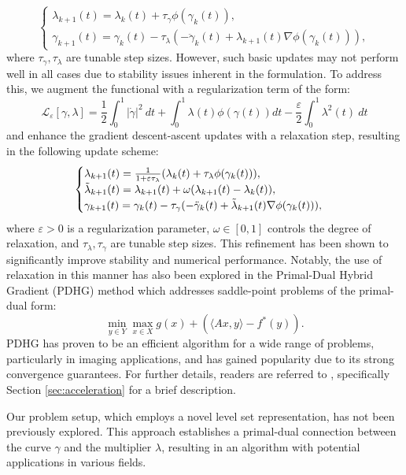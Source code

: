 \documentclass[12pt]{amsart}
\theoremstyle{definition}
\theoremstyle{remark}
\numberwithin{equation}{section}
\numberwithin{equation}{section}
\begin{document}
\[
\begin{cases}
 \lambda_{k+1}(t)  = \lambda_k(t)+\tau_\gamma \phi(\gamma_{k}(t)), \\
    \gamma_{k+1}(t)  = \gamma_k(t)-\tau_\lambda \left(-\ddot{\gamma}_k(t)+\lambda_{k+1}(t)\nabla\phi(\gamma_k(t))\right), 
\end{cases}
\]
where $\tau_\gamma, \tau_\lambda$ are tunable step sizes. However, such basic updates may not perform well in all cases due to stability issues inherent in the formulation.  To address this, we augment the functional with a regularization term of the form:
\[
\mathcal{L}_{\varepsilon}[\gamma,\lambda] = \frac{1}{2}\int_0^1 |\dot{\gamma}|^2~dt + \int_0^1\lambda(t)\phi(\gamma(t))dt -\frac{\varepsilon}{2}\int_0^1\lambda^2(t)~dt
\]
and enhance the gradient descent-ascent updates with a relaxation step, resulting in the following update scheme:  
\begin{equation*}\begin{cases}
    \lambda_{k+1}(t) = \frac{1}{1+\varepsilon\tau_{\lambda}}(\lambda_k(t)+\tau_{\lambda}\phi(\gamma_{k}(t))), \\
    \Tilde{\lambda}_{k+1}(t) = \lambda_{k+1}(t)+ \omega(\lambda_{k+1}(t)-\lambda_k(t)),\\
    \gamma_{k+1}(t) = \gamma_k(t) - \tau_{\gamma}(-\ddot{\gamma}_k(t)+\Tilde{\lambda}_{k+1}(t)\nabla\phi(\gamma_k(t))),
\end{cases}\end{equation*}
where $\varepsilon>0$ is a regularization parameter,  $\omega \in [0, 1]$ controls the degree of relaxation, and $\tau_\lambda, \tau_\gamma$ are tunable step sizes. This refinement has been shown to significantly improve  stability and numerical performance. Notably, the use of relaxation in this manner has also been explored in the Primal-Dual Hybrid Gradient (PDHG) method \cite{Chambolle:2011,Go2015} 
which addresses saddle-point problems of the primal-dual form: 
\[\min_{y\in Y}\max_{x\in X}  g(x) + \left(\langle Ax, y\rangle - f^*(y)\right).
\]
PDHG has proven to be an efficient algorithm for a wide range of problems, particularly in imaging applications,  and has gained popularity due to its strong convergence guarantees.
For further details, readers are referred to \cite{Chambolle:2011}, specifically Section \ref{sec:acceleration} for a brief description.  


Our problem setup, which employs a novel level set representation, has not been previously explored. This approach establishes a primal-dual connection between the curve $\gamma$ and the multiplier $\lambda$,  resulting in an algorithm with potential applications in various fields.
\end{document}
